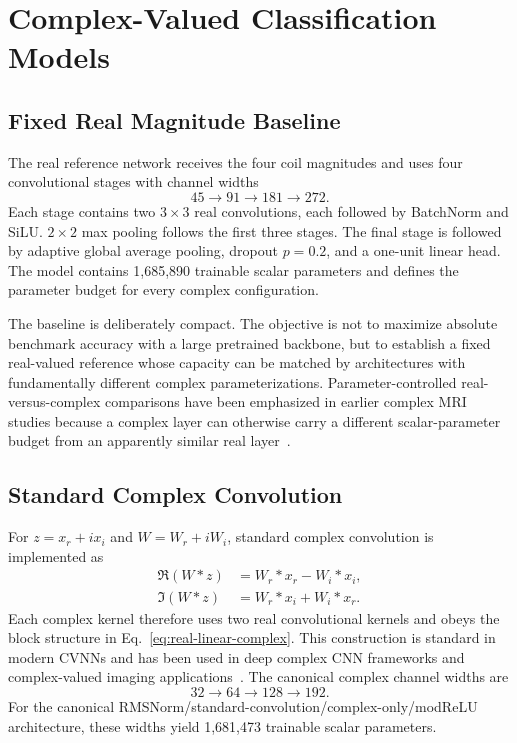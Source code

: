 \section{Complex-Valued Classification Models}\label{sec:models}
\subsection{Fixed Real Magnitude Baseline}
The real reference network receives the four coil magnitudes and uses four convolutional stages with channel widths
\begin{equation}
45\rightarrow91\rightarrow181\rightarrow272.
\end{equation}
Each stage contains two $3\times3$ real convolutions, each followed by BatchNorm and SiLU. $2\times2$ max pooling follows the first three stages. The final stage is followed by adaptive global average pooling, dropout $p=0.2$, and a one-unit linear head. The model contains 1,685,890 trainable scalar parameters and defines the parameter budget for every complex configuration.

The baseline is deliberately compact. The objective is not to maximize absolute benchmark accuracy with a large pretrained backbone, but to establish a fixed real-valued reference whose capacity can be matched by architectures with fundamentally different complex parameterizations. Parameter-controlled real-versus-complex comparisons have been emphasized in earlier complex MRI studies because a complex layer can otherwise carry a different scalar-parameter budget from an apparently similar real layer~\cite{Cole2021ComplexMRI}.

\subsection{Standard Complex Convolution}
For $z=x_r+ix_i$ and $W=W_r+iW_i$, standard complex convolution is implemented as
\begin{align}
\Re(W*z)&=W_r*x_r-W_i*x_i,\\
\Im(W*z)&=W_r*x_i+W_i*x_r.
\label{eq:complex-conv}
\end{align}
Each complex kernel therefore uses two real convolutional kernels and obeys the block structure in Eq.~\eqref{eq:real-linear-complex}. This construction is standard in modern CVNNs and has been used in deep complex CNN frameworks and complex-valued imaging applications~\cite{Guberman2016ComplexCNN,Trabelsi2018DeepComplex,Zhang2017ComplexCNNPolSAR,Lee2022CVNNSurvey}. The canonical complex channel widths are
\begin{equation}
32\rightarrow64\rightarrow128\rightarrow192.
\end{equation}
For the canonical RMSNorm/standard-convolution/complex-only/modReLU architecture, these widths yield 1,681,473 trainable scalar parameters.

